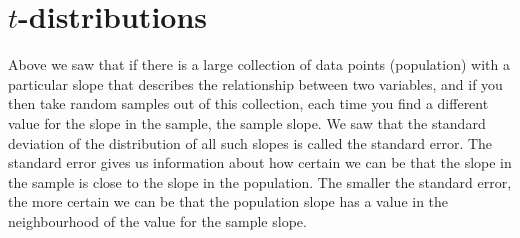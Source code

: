 \documentclass[]{report}\usepackage[]{graphicx}\usepackage[]{color}
\begin{document}



\section{$t$-distributions}

Above we saw that if there is a large collection of data points (population) with a particular slope that describes the relationship between two variables, and if you then take random samples out of this collection, each time you find a different value for the slope in the sample, the sample slope. We saw that the standard deviation of the distribution of all such slopes is called the standard error. The standard error gives us information about how certain we can be that the slope in the sample is close to the slope in the population. The smaller the standard error, the more certain we can be that the population slope has a value in the neighbourhood of the value for the sample slope.
\end{document}
